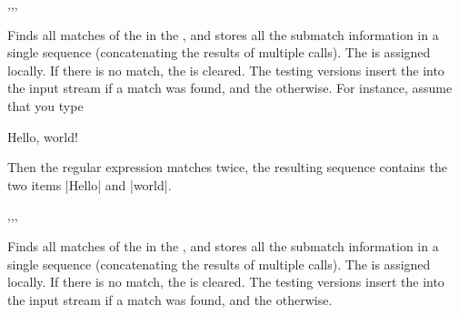 \documentclass[oneside]{book}
\begin{document}
\begin{function}{\RegexExtractAll,\RegexExtractAllT,\RegexExtractAllF,\RegexExtractAllTF}
\begin{syntax}
   
    
    
     
\end{syntax}
Finds all matches of the 
in the , and stores all the submatch information
in a single sequence (concatenating the results of
multiple  calls).
The  is assigned locally. If there is no match,
the  is cleared.
The testing versions insert the  into the input
stream if a match was found, and the  otherwise.
For instance, assume that you type
\begin{codehigh}
\RegexExtractAll {\w+} {Hello, world!} \lTmpaSeq
\end{codehigh}
Then the regular expression matches twice, the resulting
sequence contains the two items |{Hello}| and |{world}|.
\end{function}

\begin{function}{\RegexVarExtractAll,\RegexVarExtractAllT,\RegexVarExtractAllF,\RegexVarExtractAllTF}
\begin{syntax}
   
    
    
     
\end{syntax}
Finds all matches of the 
in the , and stores all the submatch information
in a single sequence (concatenating the results of
multiple  calls).
The  is assigned locally. If there is no match,
the  is cleared.
The testing versions insert the  into the input
stream if a match was found, and the  otherwise.
\end{function}
\end{document}
